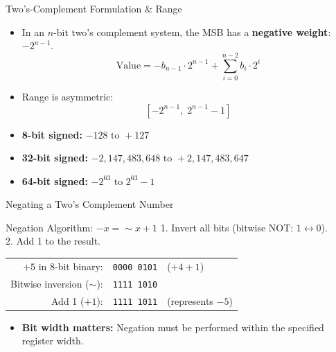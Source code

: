 \documentclass[aspectratio=169,11pt]{beamer}
\newcommand{\key}[1]{\textbf{#1}}
\newcommand{\bits}[1]{\texttt{#1}}
\begin{document}

\begin{frame}{Two's-Complement Formulation \& Range}

\begin{itemize}
  \item In an $n$-bit two's complement system, the MSB has a \key{negative weight}: $-2^{n-1}$.
  $$\text{Value} = -b_{n-1} \cdot 2^{n-1} + \sum_{i=0}^{n-2} b_i \cdot 2^i$$
  \item Range is asymmetric:
  $$\left[-2^{n-1},\; 2^{n-1} - 1\right]$$
  \item \key{8-bit signed:} $-128 \text{ to } +127$
  \item \key{32-bit signed:} $-2{,}147{,}483{,}648 \text{ to } +2{,}147{,}483{,}647$
  \item \key{64-bit signed:} $-2^{63} \text{ to } 2^{63}-1$
\end{itemize}

\end{frame}


\begin{frame}{Negating a Two's Complement Number}

\begin{block}{Negation Algorithm: $-x = \sim x + 1$}
1. Invert all bits (bitwise NOT: $1 \leftrightarrow 0$). \\
2. Add 1 to the result.
\end{block}

\begin{center}
\begin{tabular}{rrl}
\toprule
$+5$ in 8-bit binary: & \bits{0000 0101} & ($+4 + 1$) \\
Bitwise inversion ($\sim$): & \bits{1111 1010} & \\
Add 1 ($+1$): & \bits{1111 1011} & (represents $-5$) \\
\bottomrule
\end{tabular}
\end{center}

\begin{itemize}
  \item \key{Bit width matters:} Negation must be performed within the specified register width.
\end{itemize}

\end{frame}
\end{document}
